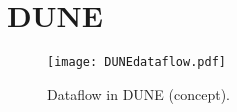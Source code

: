 \section{DUNE}

\begin{figure}[h!]
\centering
\texttt{[image: DUNEdataflow.pdf]}
\caption{Dataflow in DUNE (concept).}
\label{fig:DUNEdataflow}
\end{figure}
